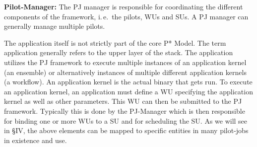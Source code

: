\documentclass[conference,final]{IEEEtran}
\newcommand{\jhanote}[1]{ {\textcolor{red} { ***shantenu: #1 }}}
\newcommand{\alnote}[1]{ {\textcolor{blue} { ***andre: #1 }}}
\newcommand{\alnote}[1]{}
\newcommand{\jhanote}[1]{}
\begin{document}
\begin{compactitem}
  


\item \textbf{Pilot-Manager:} The PJ manager is responsible for coordinating
	  the different components of the framework, i.\,e.\ the pilots, WUs and 
	  SUs. A PJ manager can generally manage multiple pilots.
\end{compactitem}

The application itself is not strictly part of the core P* Model. The
term application generally refers to the upper layer of the stack. The
application utilizes the PJ framework to execute multiple instances of
an application kernel (an ensemble) or alternatively instances of
multiple different application kernels (a workflow). An application
kernel is the actual binary that gets run.  To execute an application
kernel, an application must define a WU specifying the application
kernel as well as other parameters. This WU can then be submitted to
the PJ framework. Typically this is done by the PJ-Manager which is
then responsible for binding one or more WUs to a SU and for
scheduling the SU.	
As we will see in \S{IV}, the above elements can be mapped to specific
entities in many pilot-jobs in existence and use.

 

% 
% 
\end{document}
